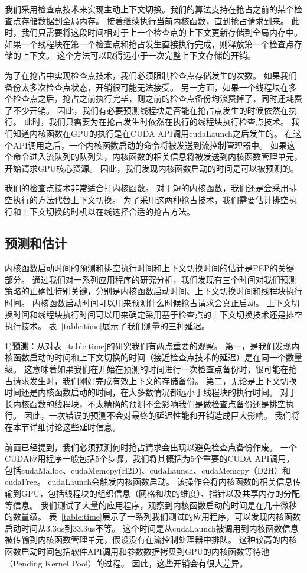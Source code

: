 我们采用检查点技术来实现主动上下文切换。我们的算法支持在抢占之前的某个检查点存储数据到全局内存。
接着继续执行当前内核函数，直到抢占请求到来。
此时，我们只需要将这段时间相对于上一个检查点的上下文更新存储到全局内存中。
如果一个线程块在第一个检查点和抢占发生直接执行完成，则释放第一个检查点存储的上下文。
这个方法可以取得远小于一次完整上下文存储的开销。

为了在抢占中实现检查点技术，我们必须限制检查点存储发生的次数。
如果我们备份太多次检查点状态，开销很可能无法接受。
另一方面，如果一个线程块在多个检查点之后，抢占之前执行完毕，则之前的检查点备份均浪费掉了，同时还耗费了不少开销。
因此，我们有必要预测线程块是否能在抢占点发生的时候依然在执行。
此时，我们只需要为在抢占发生时依然在执行的线程块执行检查点技术。
我们知道内核函数在GPU的执行是在CUDA API调用cudaLaunch之后发生的。
在这个API调用之后，一个内核函数启动的命令将被发送到流控制管理器中。
如果这个命令进入流队列的队列头，内核函数的相关信息将被发送到内核函数管理单元，开始请求GPU核心资源。
因此，我们发现内核函数启动的时间是可以被预测的。

我们的检查点技术非常适合打内核函数。
对于短的内核函数，我们还是会采用排空执行的方法代替上下文切换。
为了采用这两种抢占技术，我们需要估计排空执行和上下文切换的时机以在线选择合适的抢占方法。

\subsection{预测和估计}
内核函数启动时间的预测和排空执行时间和上下文切换时间的估计是PEP的关键部分。
通过我们对一系列应用程序的研究分析，我们发现有三个时间对我们预测策略的正确性特别关键，分别是内核函数启动时间、上下文切换时间和线程块执行时间。
内核函数启动时间可以用来预测什么时候抢占请求会真正启动。
上下文切换时间和线程块执行时间可以用来确定采用基于检查点的上下文切换技术还是排空执行技术。
表~\ref{table:time}展示了我们测量的三种延迟。

1)\textbf{预测}：从对表~\ref{table:time}的研究我们有两点重要的观察。
第一，是我们发现内核函数启动的时间和上下文切换的时间（接近检查点技术的延迟）是在同一个数量级。
这意味着如果我们在开始在预测的时间进行一次检查点备份时，很可能在抢占请求发生时，我们刚好完成有效上下文的存储备份。
第二，无论是上下文切换时间还是内核函数启动的时间，在大多数情况都远小于线程块的执行时间。
对于长内核函数的线程块，不太精确的预测不会影响我们是做检查点备份还是排空执行。
因此，一次错误的预测不会对最终的延迟性能和开销造成巨大影响。
我们将在本节详细讨论这些延时信息。

前面已经提到，我们必须预测何时抢占请求会出现以避免检查点备份作废。
一个CUDA应用程序一般包括5个步骤，我们将其概括为5个重要的CUDA API调用，包括cudaMalloc、cudaMemcpy(H2D)、cudaLaunch、cudaMemcpy（D2H）和cudaFree。
cudaLaunch会触发内核函数启动。
该操作会将内核函数的相关信息传输到GPU，包括线程块的组织信息（网格和块的维度）、指针以及共享内存的分配等信息。
我们测试了大量的应用程序，观察到内核函数启动的时间是在几十微秒的数量级。
表~\ref{table:time}展示了一系列我们测试的应用程序，可以发现内核函数启动时间从3.3us到33.3us不等。
这个时间是从cudaLaunch被调用到内核函数信息被传输到内核函数管理单元，假设没有在流控制处理器中排队。
这种较高的内核函数启动时间包括软件API调用和参数数据拷贝到GPU的内核函数等待池（Pending Kernel Pool）的过程。
因此，这些开销会有很大差异。

